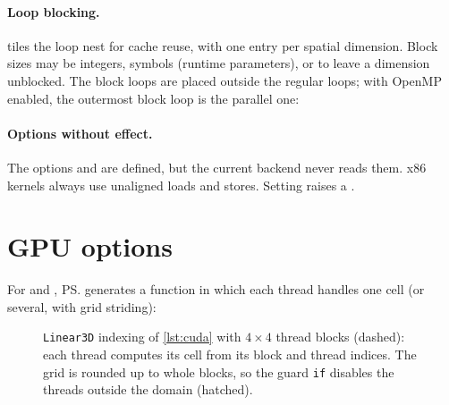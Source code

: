 \paragraph{Loop blocking.}
 tiles the loop nest for cache reuse, with one
entry per spatial dimension. Block sizes may be integers, symbols (runtime parameters),
or  to leave a dimension unblocked. The block loops are placed outside the
regular loops; with OpenMP enabled, the outermost block loop is the parallel one:

\paragraph{Options without effect.}
The options  and
 are defined, but the current backend never
reads them. x86 kernels always use unaligned loads and stores. Setting
 raises a .

\section{GPU options}\label{sec:gpu-options}

For  and , \ps{} generates a 
function in which each thread handles one cell (or several, with grid striding):

\begin{figure}[htbp]
  \centering
  
  \caption[\texttt{Linear3D} GPU indexing]{\texttt{Linear3D} indexing of \cref{lst:cuda} with $4\times4$ thread blocks (dashed): each thread computes its cell from its block and thread indices. The grid is rounded up to whole blocks, so the guard \texttt{if} disables the threads outside the domain (hatched).}
  \label{fig:gpu-mapping}
\end{figure}

